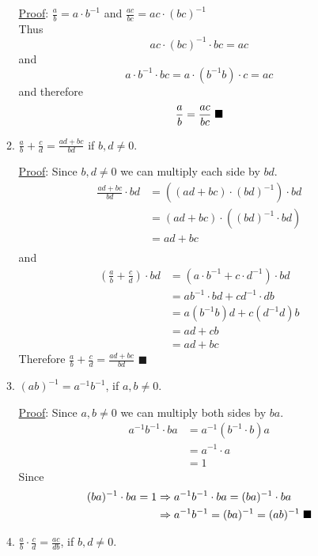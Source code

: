 \documentclass[12pt]{article}
\begin{document}
\begin{enumerate}
\begin{enumerate}
\underline{Proof}: $\frac{a}{b} = a \cdot b^{-1}$ and $\frac{ac}{bc} = ac \cdot (bc)^{-1}$\\ 
Thus $$ac \cdot (bc)^{-1} \cdot bc = ac$$ and $$a \cdot b^{-1} \cdot bc = a \cdot (b^{-1}b) \cdot c = ac$$ and therefore $$\frac{a}{b}=\frac{ac}{bc} \hspace{.1cm} \blacksquare$$

\item $\frac{a}{b} + \frac{c}{d} =\frac{ad + bc}{bd}$ if $b,d \neq 0$.

\underline{Proof}: Since $b,d \neq 0$ we can multiply each side by $bd$.
\begin{align*}
\frac{ad + bc}{bd} \cdot bd &= ((ad + bc) \cdot (bd)^{-1}) \cdot bd\\
			   &= (ad + bc) \cdot ((bd)^{-1} \cdot bd)\\
			   &=	 ad + bc\\
\end{align*}
and	
\begin{align*}
\left(\frac{a}{b} + \frac{c}{d}\right) \cdot bd &= (a \cdot b^{-1} + c \cdot d^{-1}) \cdot bd\\
			   &=	 ab^{-1} \cdot bd + cd^{-1} \cdot db\\
			   &=  a(b^{-1}b)d + c(d^{-1}d)b\\
			   &= ad + cb\\
			   &= ad + bc
\end{align*}
Therefore 	$\frac{a}{b} + \frac{c}{d} =\frac{ad + bc}{bd}$ $\blacksquare$

\item $(ab)^{-1} = a^{-1}b^{-1}$, if $a,b \neq 0$.

\underline{Proof}: Since $a,b \neq 0$ we can multiply both sides by $ba$.
\begin{align*}
a^{-1}b^{-1} \cdot ba &= a^{-1}(b^{-1} \cdot b)a\\
				&= a^{-1} \cdot a\\
				&= 1
\end{align*}
Since 
\begin{align*}
(ba)^{-1} \cdot ba = 1 &\Rightarrow a^{-1}b^{-1} \cdot ba = (ba)^{-1} \cdot ba \\
				 &\Rightarrow a^{-1}b^{-1} = (ba)^{-1}  = (ab)^{-1} \hspace{.1cm} \blacksquare
\end{align*}

\item $\frac{a}{b} \cdot \frac{c}{d} = \frac{ac}{db}$, if $b,d \neq 0$.


\end{enumerate}
\end{enumerate}
\end{document}
